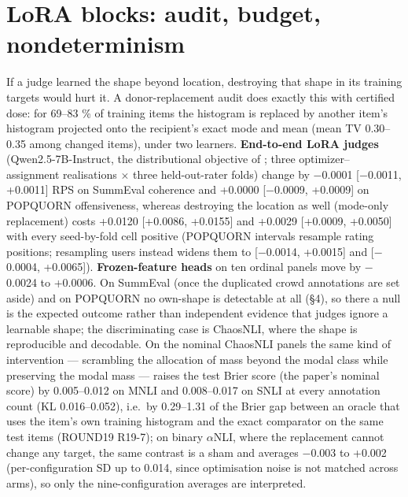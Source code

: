 \documentclass[10pt,twocolumn]{article}
\begin{document}
\section{LoRA blocks: audit, budget, nondeterminism}


If a judge learned the shape beyond location, destroying that shape in its training targets would hurt it. A donor-replacement audit does exactly this with certified dose: for 69--83 \% of training items the histogram is replaced by another item's histogram projected onto the recipient's exact mode and mean (mean TV 0.30--0.35 among changed items), under two learners. \textbf{End-to-end LoRA judges} (Qwen2.5-7B-Instruct, the distributional objective of \citealp{chen2025beyond}; three optimizer--assignment realisations $\times$ three held-out-rater folds) change by $-$0.0001 {[}$-$0.0011, +0.0011{]} RPS on SummEval coherence and +0.0000 {[}$-$0.0009, +0.0009{]} on POPQUORN offensiveness, whereas destroying the location as well (mode-only replacement) costs +0.0120 {[}+0.0086, +0.0155{]} and +0.0029 {[}+0.0009, +0.0050{]} with every seed-by-fold cell positive (POPQUORN intervals resample rating positions; resampling users instead widens them to {[}$-$0.0014, +0.0015{]} and {[}$-$0.0004, +0.0065{]}). \textbf{Frozen-feature heads} on ten ordinal panels move by $-$0.0024 to +0.0006. On SummEval (once the duplicated crowd annotations are set aside) and on POPQUORN no own-shape is detectable at all (\S{}4), so there a null is the expected outcome rather than independent evidence that judges ignore a learnable shape; the discriminating case is ChaosNLI, where the shape is reproducible and decodable. On the nominal ChaosNLI panels the same kind of intervention --- scrambling the allocation of mass beyond the modal class while preserving the modal mass --- raises the test Brier score (the paper's nominal score) by 0.005--0.012 on MNLI and 0.008--0.017 on SNLI at every annotation count (KL 0.016--0.052), i.e.~by 0.29--1.31 of the Brier gap between an oracle that uses the item's own training histogram and the exact comparator on the same test items (ROUND19 R19-7); on binary $\alpha$NLI, where the replacement cannot change any target, the same contrast is a sham and averages $-$0.003 to +0.002 (per-configuration SD up to 0.014, since optimisation noise is not matched across arms), so only the nine-configuration averages are interpreted.
\end{document}
